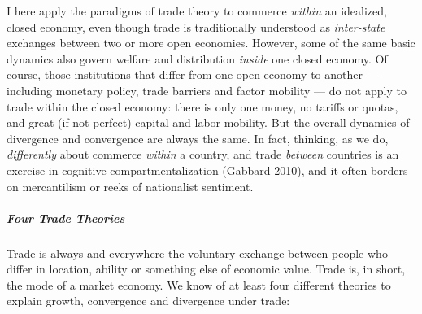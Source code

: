 I here apply the paradigms of trade theory to commerce \emph{within} an idealized, closed economy, even though trade is traditionally understood as \emph{inter-state} exchanges between two or more open economies. However, some of the same basic dynamics also govern welfare and distribution \emph{inside} one closed economy. Of course, those institutions that differ from one open economy to another --- including monetary policy, trade barriers and factor mobility --- do not apply to trade within the closed economy: there is only one money, no tariffs or quotas, and great (if not perfect) capital and labor mobility. But the overall dynamics of divergence and convergence are always the same. In fact, thinking, as we do, \emph{differently} about commerce \emph{within} a country, and trade \emph{between} countries is an exercise in cognitive compartmentalization (Gabbard 2010), and it often borders on mercantilism or reeks of nationalist sentiment. 

\subparagraph{Four Trade Theories}  \label{sec:trade_theories} Trade is always and everywhere the voluntary exchange between people who differ in location, ability or something else of economic value. Trade is, in short, the mode of a market economy. We know of at least four different theories to explain growth, convergence and divergence under trade:

